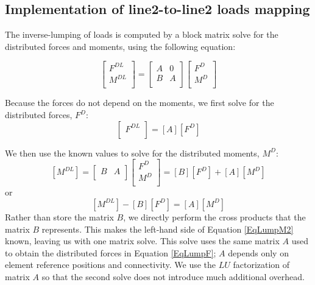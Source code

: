 \documentclass[10pt,letterpaper,oneside,notitlepage]{article}
\begin{document}
\begin{algorithmic}[1]
\EndProcedure
\end{algorithmic}


\subsection {Implementation of line2-to-line2 loads mapping}
The inverse-lumping of loads is computed by a block matrix solve for the distributed forces and moments, 
using the following equation:

\begin{equation}
\label{EqLump}
   \begin{bmatrix}
   F^{DL} \\
   M^{DL} \\
   \end{bmatrix}
=
   \begin{bmatrix}
      A & 0 \\
      B & A \\   
   \end{bmatrix}
   \begin{bmatrix}
   F^{D} \\
   M^{D} \\
   \end{bmatrix}
\end{equation}

Because the forces do not depend on the moments, we first solve for the distributed forces, $F^D$:
\begin{equation}
\label{EqLumpF}
   \begin{bmatrix}   F^{DL} \\   \end{bmatrix}
=
   \left[      A    \right]
   \left[   F^{D}  \right]
\end{equation}

We then use the known values to solve for the distributed moments, $M^D$:
\begin{equation}
\label{EqLumpM1}
   \left[   M^{DL} \right]
=
   \begin{bmatrix} B & A \\   \end{bmatrix}
   \begin{bmatrix}
   F^{D} \\
   M^{D} \\
   \end{bmatrix}
= \left[   B \right] \left[   F^D \right] + \left[   A \right] \left[   M^D \right] 
\end{equation}
or
\begin{equation}
\label{EqLumpM2}
\left[   M^{DL} \right] - \left[   B \right] \left[   F^D \right] = \left[   A \right] \left[   M^D \right]
\end{equation}
Rather than store the matrix $B$, we directly perform the cross products that the matrix $B$ represents.
This makes the left-hand side of Equation \ref{EqLumpM2} known, leaving us with one matrix solve. This 
solve uses the same matrix $A$ used to obtain the distributed forces in Equation \ref{EqLumpF}; $A$ depends 
only on element reference positions and connectivity. We use 
the $LU$ factorization of matrix $A$ so that the second solve does not introduce much additional overhead.
\end{document}
